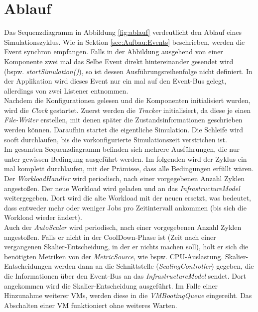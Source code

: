\section{Ablauf}
Das Sequenzdiagramm in Abbildung \ref{fig:ablauf} verdeutlicht den Ablauf eines Simulationszyklus. Wie in Sektion \ref{sec:Aufbau:Events} beschrieben, werden die Event synchron empfangen. Falls in der Abbildung ausgehend von einer Komponente zwei mal das Selbe Event direkt hintereinander gesendet wird (bspw. \textit{startSimulation()}), so ist dessen Ausführungsreihenfolge nicht definiert. In der Applikation wird dieses Event nur ein mal auf den Event-Bus gelegt, allerdings von zwei Listener entnommen. \\
Nachdem die Konfigurationen gelesen und die Komponenten initialisiert wurden, wird die \textit{Clock} gestartet. Zuerst werden die \textit{Tracker} initialisiert, da diese je einen \textit{File-Writer} erstellen, mit denen später die Zustandsinformationen geschrieben werden können. Daraufhin startet die eigentliche Simulation. Die Schleife wird sooft durchlaufen, bis die vorkonfigurierte Simulationszeit verstrichen ist. \\
Im gesamten Sequenzdiagramm befinden sich mehrere Ausführungen, die nur unter gewissen Bedingung ausgeführt werden. Im folgenden wird der Zyklus ein mal komplett durchlaufen, mit der Prämisse, dass alle Bedingungen erfüllt wären. \\
Der \textit{WorkloadHandler} wird periodisch, nach einer vorgegebenen Anzahl Zyklen angestoßen. Der neue Workload wird geladen und an das \textit{InfrastructureModel} weitergegeben. Dort wird die alte Workload mit der neuen ersetzt, was bedeutet, dass entweder mehr oder weniger Jobs pro Zeitintervall ankommen (bis sich die Workload wieder ändert). \\
Auch der \textit{AutoScaler} wird periodisch, nach einer vorgegebenen Anzahl Zyklen angestoßen. Falls er nicht in der CoolDown-Phase ist (Zeit nach einer vergangenen Skalier-Entscheidung, in der er nichts machen soll), holt er sich die benötigten Metriken von der \textit{MetricSource}, wie bspw. CPU-Auslastung. Skalier-Entscheidungen werden dann an die Schnittstelle (\textit{ScalingController}) gegeben, die die Informationen über den Event-Bus an das \textit{InfrastructureModel} sendet. Dort angekommen wird die Skalier-Entscheidung ausgeführt. Im Falle einer Hinzunahme weiterer VMs, werden diese in die \textit{VMBootingQueue} eingereiht. Das Abschalten einer VM funktioniert ohne weiteres Warten. \\
